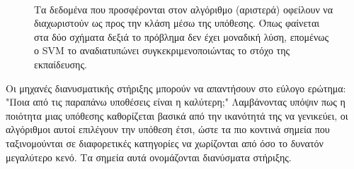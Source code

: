 \begin{figure}[!htb]
\begin{minipage}[b]{0.45\textwidth}
\begin{subfigure}[b]{\linewidth}
{    	}
   		\end{subfigure}\\[\baselineskip]
   		\begin{subfigure}[b]{\linewidth}
   			 \resizebox{0.5\textwidth}{1.5cm} {
   			 	\centering
}
   		\end{subfigure}
   	\end{minipage}
   	\caption[Χώρος ταξινόμησης SVM]{Τα δεδομένα που προσφέρονται στον αλγόριθμο (αριστερά) οφείλουν να διαχωριστούν ως προς την κλάση μέσω της υπόθεσης. Όπως φαίνεται στα δύο σχήματα δεξιά το πρόβλημα δεν έχει μοναδική λύση, επομένως ο \gls{SVM} το αναδιατυπώνει συγκεκριμενοποιώντας το στόχο της εκπαίδευσης.}\label{fig:svm}
   \end{figure}
   
Οι μηχανές διανυσματικής στήριξης μπορούν να απαντήσουν στο εύλογο ερώτημα: "Ποια από τις παραπάνω υποθέσεις είναι η καλύτερη;" Λαμβάνοντας υπόψιν πως η ποιότητα μιας υπόθεσης καθορίζεται βασικά από την ικανότητά της να γενικεύει, οι αλγόριθμοι αυτοί επιλέγουν την υπόθεση έτσι, ώστε τα πιο κοντινά σημεία που ταξινομούνται σε διαφορετικές κατηγορίες να χωρίζονται από όσο το δυνατόν
μεγαλύτερο κενό. Τα σημεία αυτά ονομάζονται διανύσματα στήριξης.

